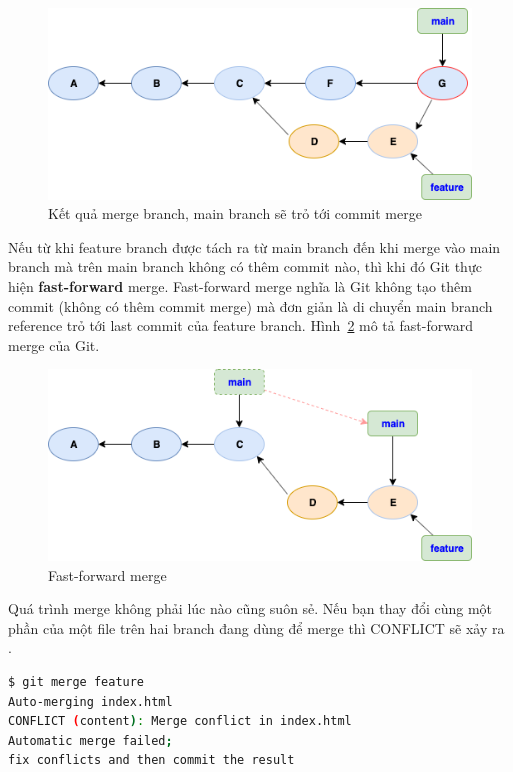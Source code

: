 \documentclass[a4paper, 11pt]{article}
\begin{document}
\begin{figure}
\centering
\includegraphics[scale=0.6]{git-merge-result.png}
\caption{Kết quả merge branch, main branch sẽ trỏ tới commit merge}
\label{fig:merge-result}
\end{figure}

Nếu từ khi feature branch được tách ra từ main branch đến khi merge vào main branch mà trên main branch không có thêm commit nào, thì khi đó Git thực hiện \textbf{fast-forward} merge. Fast-forward merge nghĩa là Git không tạo thêm commit (không có thêm commit merge) mà đơn giản là di chuyển main branch reference trỏ tới last commit của feature branch. Hình~\ref{fig:fast-forward-merge} mô tả fast-forward merge của Git.

\begin{figure}
\centering
\includegraphics[scale=0.6]{git-fast-forward-merge.png}
\caption{Fast-forward merge}
\label{fig:fast-forward-merge}
\end{figure}

Quá trình merge không phải lúc nào cũng suôn sẻ. Nếu bạn thay đổi cùng một phần của một file trên hai branch đang dùng để merge thì CONFLICT sẽ xảy ra .
\begin{lstlisting}[language=bash]
$ git merge feature
Auto-merging index.html
CONFLICT (content): Merge conflict in index.html 
Automatic merge failed; 
fix conflicts and then commit the result
\end{lstlisting}
\end{document}
